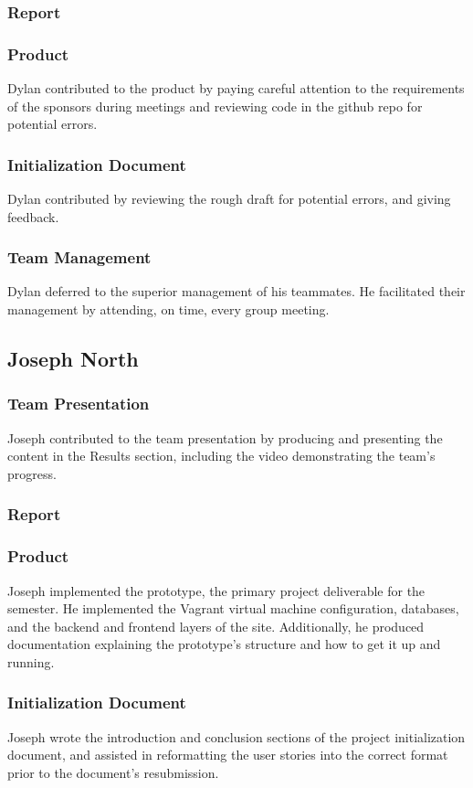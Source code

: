\documentclass[12pt]{article}
\begin{document}
\begin{spacing}{1.5}
\subsubsection{Report}
\subsubsection{Product}
Dylan contributed to the product by paying careful attention to the requirements of the sponsors during meetings and reviewing code in the github repo for potential errors.
\subsubsection{Initialization Document}
Dylan contributed by reviewing the rough draft for potential errors, and giving feedback. 
\subsubsection{Team Management}
Dylan deferred to the superior management of his teammates.  He facilitated their management by attending, on time, every group meeting.

\clearpage

\subsection{Joseph North}
\subsubsection{Team Presentation}
Joseph contributed to the team presentation by producing and presenting the content in the Results section, including the video demonstrating the team's progress.
\subsubsection{Report}
\subsubsection{Product}
Joseph implemented the prototype, the primary project deliverable for the semester. He implemented the Vagrant virtual machine configuration, databases, and the backend and frontend layers of the site. Additionally, he produced documentation explaining the prototype's structure and how to get it up and running.
\subsubsection{Initialization Document}
Joseph wrote the introduction and conclusion sections of the project initialization document, and assisted in reformatting the user stories into the correct format prior to the document's resubmission.

\end{spacing}
\end{document}
